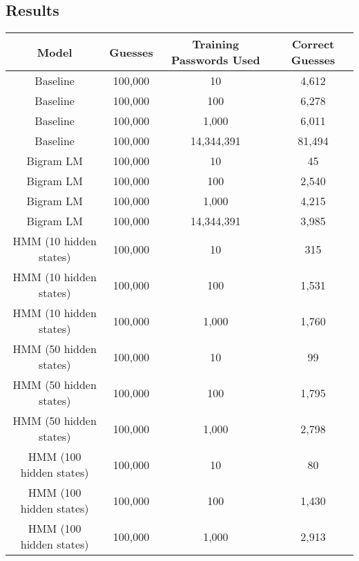 \documentclass{amsart}
\theoremstyle{definition}
\theoremstyle{remark}
\numberwithin{equation}{section}
\begin{document}
\subsection{Results}
\begin{center}
\begin{tabular}{||c c c c||}
\hline
Model & Guesses & Training Passwords Used & Correct Guesses
\\ [0.5ex]
\hline\hline
Baseline & 100,000 & 10 & 4,612 \\
\hline
Baseline & 100,000 & 100 & 6,278 \\
\hline
Baseline & 100,000 & 1,000 & 6,011 \\
\hline
Baseline & 100,000 & 14,344,391 & 81,494 \\
\hline
Bigram LM & 100,000 & 10 & 45 \\
\hline
Bigram LM & 100,000 & 100 & 2,540 \\
\hline
Bigram LM & 100,000 & 1,000 & 4,215 \\
\hline
Bigram LM & 100,000 & 14,344,391 & 3,985 \\
\hline
HMM (10 hidden states) & 100,000 & 10 & 315 \\
\hline
HMM (10 hidden states) & 100,000 & 100 & 1,531 \\
\hline
HMM (10 hidden states) & 100,000 & 1,000 & 1,760 \\
\hline
HMM (50 hidden states) & 100,000 & 10 & 99 \\
\hline
HMM (50 hidden states) & 100,000 & 100 & 1,795 \\
\hline
HMM (50 hidden states) & 100,000 & 1,000 & 2,798 \\
\hline
HMM (100 hidden states) & 100,000 & 10 & 80 \\
\hline
HMM (100 hidden states) & 100,000 & 100 & 1,430 \\
\hline
HMM (100 hidden states) & 100,000 & 1,000 & 2,913 \\
[1ex]
\hline
\end{tabular}
\end{center}
\end{document}
